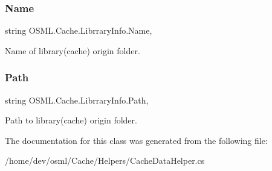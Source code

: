 \subsubsection{\texorpdfstring{Name}{Name}}
{\footnotesize\ttfamily string O\+S\+M\+L.\+Cache.\+Librrary\+Info.\+Name\hspace{0.3cm}{\ttfamily [get]}, {\ttfamily [set]}}



Name of library(cache) origin folder. 

\mbox{\label{classOSML_1_1Cache_1_1LibrraryInfo_adaf3deef45faeadf1595e9fe078511bc}} 
\subsubsection{\texorpdfstring{Path}{Path}}
{\footnotesize\ttfamily string O\+S\+M\+L.\+Cache.\+Librrary\+Info.\+Path\hspace{0.3cm}{\ttfamily [get]}, {\ttfamily [set]}}



Path to library(cache) origin folder. 



The documentation for this class was generated from the following file\+:\begin{DoxyCompactItemize}
\item 
/home/dev/osml/\+Cache/\+Helpers/Cache\+Data\+Helper.\+cs\end{DoxyCompactItemize}
